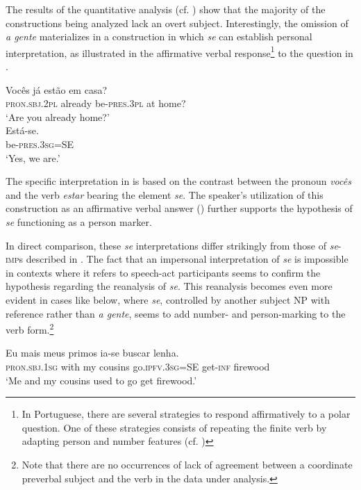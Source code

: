 \documentclass[output=paper]{langscibook}
\begin{document}
The results of the quantitative analysis (cf. ) show that the majority of the constructions being analyzed lack an overt subject. Interestingly, the omission of \textit{a gente} materializes in a construction in which \textit{se} can establish personal interpretation, as illustrated in the affirmative verbal response\footnote{In Portuguese, there are several strategies to respond affirmatively to a polar question. One of these strategies consists of repeating the finite verb by adapting person and number features (cf. \citealt{Martins2013,Martins2016a})}  to the question in .

\ea\label{ex:henriques:20}
 \begin{xlist}
  \gll Vocês já estão em casa?\\
         \textsc{pron.sbj.2pl} already be-\textsc{pres.3pl} at home?\\
  \glt `Are you already home?'\\
  \gll Está-se.\\
         be-\textsc{pres.3sg}=SE\\
 \glt `Yes, we are.'
 \end{xlist}
\z 

The specific interpretation in  is based on the contrast between the  pronoun \textit{vocês} and the verb \textit{estar} bearing the element \textit{se}. The speaker's utilization of this construction as an affirmative verbal answer (\citealt{Martins2013,Martins2016a}) further supports the hypothesis of \textit{se} functioning as a  person marker. 


In direct comparison, these \textit{se} interpretations differ strikingly from those of \textit{se}-\textsc{imp}s described in . The fact that an impersonal interpretation of \textit{se} is impossible in contexts where it refers to speech-act participants seems to confirm the hypothesis regarding the reanalysis of \textit{se}. This reanalysis becomes even more evident in cases like  below, where \textit{se}, controlled by another subject NP with  reference rather than \textit{a gente}, seems to add number- and person-marking to the  verb form.\footnote{Note that there are no occurrences of lack of agreement between a coordinate preverbal subject and the verb in the data under analysis.}

\ea\label{ex:henriques:21}
 \gll Eu mais meus primos ia-se buscar lenha. \\ 
         \textsc{pron.sbj.1sg} with my cousins go.\textsc{ipfv.3sg}=SE get-\textsc{inf} firewood\\
 \glt `Me and my cousins used to go get firewood.'
\z
\end{document}
